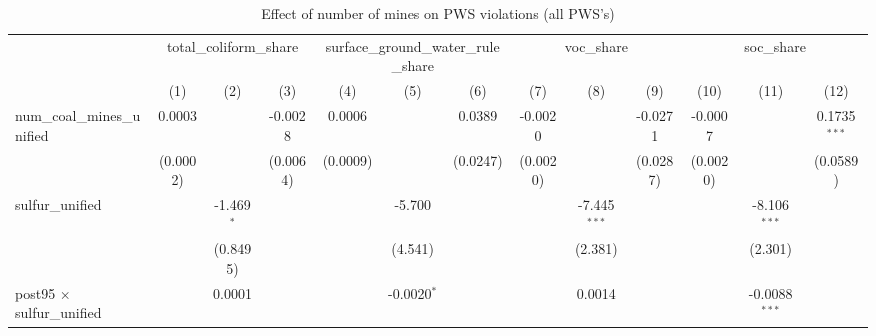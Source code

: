 
\begin{table}[htbp]
   \caption{\label{olsrf2sls_nummine_non_mine_vio_1985to2005allhucs_coalunified} Effect of number of mines on PWS violations (all PWS's)}
   \bigskip
   \centering
   \begin{adjustbox}{width = \textwidth, center}
      \begin{tabular}{lcccccccccccc}
         \toprule
          & \multicolumn{3}{c}{total\_coliform\_share} & \multicolumn{3}{c}{surface\_ground\_water\_rule\_share} & \multicolumn{3}{c}{voc\_share} & \multicolumn{3}{c}{soc\_share}\\
                                                          & (1)           & (2)                   & (3)                   & (4)                   & (5)           & (6)           & (7)           & (8)                   & (9)                   & (10)                  & (11)            & (12)\\  
         \midrule 
         num\_coal\_mines\_unified                        & 0.0003        &                       & -0.0028               & 0.0006                &               & 0.0389        & -0.0020       &                       & -0.0271               & -0.0007               &                 & 0.1735$^{***}$\\   
                                                          & (0.0002)      &                       & (0.0064)              & (0.0009)              &               & (0.0247)      & (0.0020)      &                       & (0.0287)              & (0.0020)              &                 & (0.0589)\\   
         sulfur\_unified                                  &               & -1.469$^{*}$          &                       &                       & -5.700        &               &               & -7.445$^{***}$        &                       &                       & -8.106$^{***}$  &   \\   
                                                          &               & (0.8495)              &                       &                       & (4.541)       &               &               & (2.381)               &                       &                       & (2.301)         &   \\   
         post95 $\times$ sulfur\_unified                  &               & 0.0001                &                       &                       & -0.0020$^{*}$ &               &               & 0.0014                &                       &                       & -0.0088$^{***}$ &   \\   

\end{tabular}
\end{adjustbox}
\end{table}
